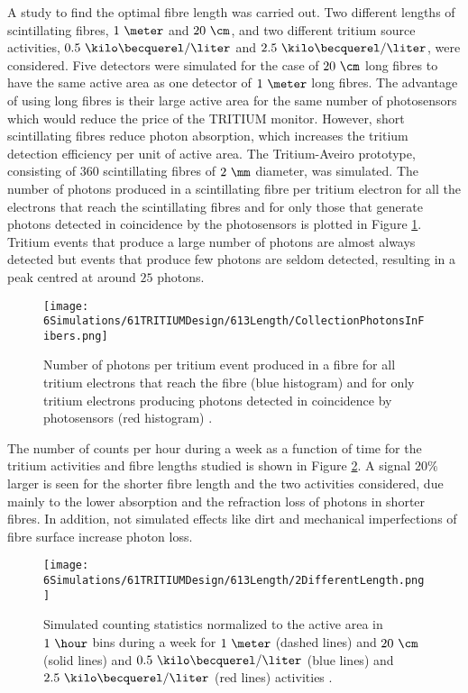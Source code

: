 A study to find the optimal fibre length was carried out. Two different lengths of scintillating fibres, $1~\meter$ and $20~\cm$, and two different tritium source activities, $0.5~\kilo\becquerel/\liter$ and $2.5~\kilo\becquerel/\liter$, were considered. Five detectors were simulated for the case of $20~\cm$ long fibres to have the same active area as one detector of $1~\meter$ long fibres. The advantage of using long fibres is their large active area for the same number of photosensors which would reduce the price of the TRITIUM monitor. However, short scintillating fibres reduce photon absorption, which increases the tritium detection efficiency per unit of active area. The Tritium-Aveiro prototype, consisting of $360$ scintillating fibres of $2~\mm$ diameter, was simulated. The number of photons produced in a scintillating fibre per tritium electron for all the electrons that reach the scintillating fibres and for only those that generate photons detected in coincidence by the photosensors is plotted in Figure \ref{fig:PhotonsFibersYesNoPhotosensors}. Tritium events that produce a large number of photons are almost always detected but events that produce few photons are seldom detected, resulting in a peak centred at around $25$ photons.  
\begin{figure}[h]
\centering
\texttt{[image: 6Simulations/61TRITIUMDesign/613Length/CollectionPhotonsInFibers.png]}
\caption{Number of photons per tritium event produced in a fibre for all tritium electrons that reach the fibre (blue histogram) and for only tritium electrons producing photons detected in coincidence by photosensors (red histogram) \cite{SimulationPaperCarlos}.\label{fig:PhotonsFibersYesNoPhotosensors}}
\end{figure}
The number of counts per hour during a week as a function of time for the tritium activities and fibre lengths studied is shown in Figure \ref{fig:CountsOver60minDifferentLength}. A signal $20\%$ larger is seen for the shorter fibre length and the two activities considered, due mainly to the lower absorption and the refraction loss of photons in shorter fibres. In addition, not simulated effects like dirt and mechanical imperfections of fibre surface increase photon loss.

\begin{figure}[h]
\centering
\texttt{[image: 6Simulations/61TRITIUMDesign/613Length/2DifferentLength.png]}
\caption{Simulated counting statistics normalized to the active area in $1~\hour$ bins during a week for $1~\meter$ (dashed lines) and $20~\cm$ (solid lines) and $0.5~\kilo\becquerel/\liter$ (blue lines) and $2.5~\kilo\becquerel/\liter$ (red lines) activities \cite{SimulationPaperCarlos}. \label{fig:CountsOver60minDifferentLength}}
\end{figure}

